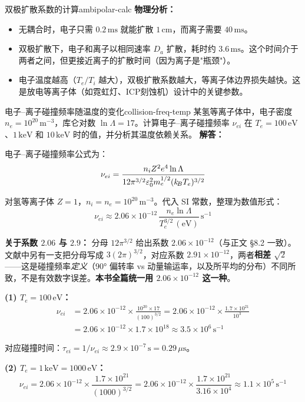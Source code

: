 \begin{example}{双极扩散系数的计算}{ambipolar-calc}
\textbf{物理分析：}
\begin{itemize}[leftmargin=*,itemsep=0pt]
\item 无耦合时，电子只需 $0.2\,\mathrm{ms}$ 就能扩散 $1\,\mathrm{cm}$，而离子需要 $40\,\mathrm{ms}$。
\item 双极扩散下，电子和离子以相同速率 $D_a$ 扩散，耗时约 $3.6\,\mathrm{ms}$。这个时间介于两者之间，但更接近离子的扩散时间（因为离子是"瓶颈"）。
\item 电子温度越高（$T_e/T_i$ 越大），双极扩散系数越大，等离子体边界损失越快。这是放电等离子体（如霓虹灯、ICP刻蚀机）设计中的关键参数。
\end{itemize}
\end{example}

\begin{example}{电子--离子碰撞频率随温度的变化}{collision-freq-temp}
某氢等离子体中，电子密度 $n_e = 10^{20}\,\mathrm{m}^{-3}$，库仑对数 $\ln\Lambda = 17$。计算电子--离子碰撞频率 $\nu_{ei}$ 在 $T_e = 100\,\mathrm{eV}$、$1\,\mathrm{keV}$ 和 $10\,\mathrm{keV}$ 时的值，并分析其温度依赖关系。
\tcblower
\textbf{解答：}

电子--离子碰撞频率公式为：
\[
\nu_{ei} = \frac{n_i Z^2 e^4 \ln\Lambda}{12\pi^{3/2}\varepsilon_0^2 m_e^{1/2}(k_{\!B}T_e)^{3/2}}
\]

对氢等离子体 $Z=1$，$n_i = n_e = 10^{20}\,\mathrm{m}^{-3}$。代入 SI 常数，整理为数值形式：
\[
\nu_{ei} \approx 2.06\times 10^{-12}\,\frac{n_e\ln\Lambda}{T_e^{3/2}\,\mathrm{(eV)}}\,\mathrm{s}^{-1}
\]

\textbf{关于系数 $2.06$ 与 $2.9$：} 分母 $12\pi^{3/2}$ 给出系数 $2.06\times10^{-12}$（与正文 \S8.2 一致）。文献中另有一支把分母写成 $3(2\pi)^{3/2}$，对应系数 $2.91\times10^{-12}$，两者\textbf{相差 $\sqrt2$}——这是碰撞频率\emph{定义}（90° 偏转率 vs 动量输运率，以及所平均的分布）不同所致，不是有效数字误差。\textbf{本书全篇统一用 $2.06\times10^{-12}$ 这一种}。

\textbf{(1) $T_e = 100\,\mathrm{eV}$：}
\[
\begin{aligned}
\nu_{ei} &= 2.06\times 10^{-12}\times\frac{10^{20}\times 17}{(100)^{3/2}}
= 2.06\times 10^{-12}\times\frac{1.7\times 10^{21}}{10^3}\\
&= 2.06\times 10^{-12}\times 1.7\times 10^{18}
\approx 3.5\times 10^{6}\,\mathrm{s}^{-1}
\end{aligned}
\]

对应碰撞时间：$\tau_{ei} = 1/\nu_{ei} \approx 2.9\times 10^{-7}\,\mathrm{s} = 0.29\,\mu\mathrm{s}$。

\textbf{(2) $T_e = 1\,\mathrm{keV} = 1000\,\mathrm{eV}$：}
\[
\nu_{ei} = 2.06\times 10^{-12}\times\frac{1.7\times 10^{21}}{(1000)^{3/2}}
= 2.06\times 10^{-12}\times\frac{1.7\times 10^{21}}{3.16\times 10^4}
\approx 1.1\times 10^{5}\,\mathrm{s}^{-1}
\]


\end{example}
